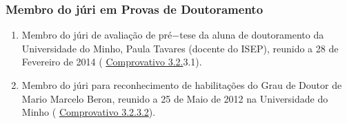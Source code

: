 \documentclass[11pt]{article}
\begin{document}
\subsubsection{Membro do júri em Provas de Doutoramento}
\begin{enumerate}
\item{Membro do júri de avaliação de pré$-$tese da aluna de doutoramento da Universidade do Minho, Paula Tavares (docente do ISEP), reunido a 28 de Fevereiro de 2014 (
\href{run:JuriProvas/ArguentePaulaTavares.pdf}{Comprovativo 3.2.}3.1).}
\item{Membro do júri para reconhecimento de habilitações do Grau de Doutor de Mario Marcelo Beron, reunido a 25 de Maio de 2012 na Universidade do Minho (
\href{run:JuriProvas/RecMarioBeron.pdf}{Comprovativo 3.2.3.2}).}
\end{enumerate}
\end{document}
